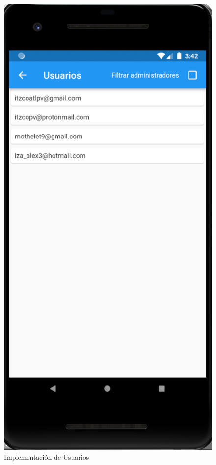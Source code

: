 \documentclass{article}
\begin{document}
\begin{figure}[H]
    \centering
    \includegraphics[scale=0.8]{imgs/Imp/Usuarios}
    \caption{Implementación de Usuarios}
\end{figure}
\end{document}
